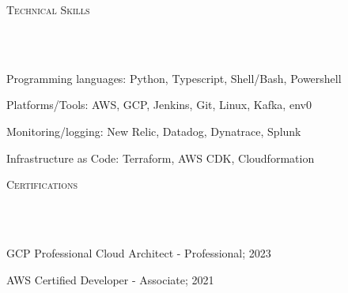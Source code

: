 \documentclass{article}
\newcommand{\header}[1]{{
\hspace*{-15pt}\vspace*{6pt} \textsc{#1}} \vspace*{-6pt} 
\lineunder
}
\newcommand{\lineunder}{
\vspace*{-8pt} \\ \hspace*{-18pt} 
\hrulefill \\
}
\renewcommand{\labelitemii}{
$\vcenter{\hbox{\tiny$\bullet$}}$\hspace*{-3pt}
}
\newenvironment{bullet-list-major}{
\begin{list}{\labelitemii}{\setlength\leftmargin{3pt} 
\topsep 0pt \itemsep -2pt}}{\vspace*{4pt}\end{list}
}
\begin{document}
\vspace*{8pt}%
\header{Technical Skills}
    \begin{bullet-list-major}
    \item Programming languages: Python, Typescript, Shell/Bash, Powershell
    \vspace{2pt}
    \item Platforms/Tools: AWS, GCP, Jenkins, Git, Linux, Kafka, env0
    \vspace{2pt}
    \item Monitoring/logging: New Relic, Datadog, Dynatrace, Splunk
    \vspace{2pt}
    \item Infrastructure as Code: Terraform, AWS CDK, Cloudformation
    \end{bullet-list-major}
    
\vspace*{8pt}%
\header{Certifications}
    \begin{bullet-list-major}
    \item GCP Professional Cloud Architect - Professional; 2023
    \vspace{2pt}
    \item AWS Certified Developer - Associate; 2021
    \end{bullet-list-major}
\end{document}
